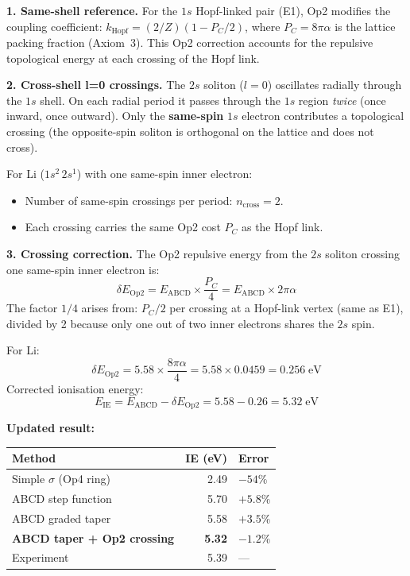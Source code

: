 \noindent\textbf{1. Same-shell reference.}
For the $1s$ Hopf-linked pair (E1), Op2
modifies the coupling coefficient:
$k_{\text{Hopf}} = (2/Z)(1 - P_C/2)$,
where $P_C = 8\pi\alpha$ is the lattice
packing fraction (Axiom~3).  This Op2
correction accounts for the repulsive
topological energy at each crossing of the
Hopf link.

\noindent\textbf{2. Cross-shell l=0 crossings.}
The $2s$ soliton ($l{=}0$) oscillates radially
through the $1s$ shell.  On each radial period
it passes through the $1s$ region \emph{twice}
(once inward, once outward).  Only the
\textbf{same-spin} $1s$ electron contributes
a topological crossing (the opposite-spin
soliton is orthogonal on the lattice and
does not cross).

For Li ($1s^2\,2s^1$) with one same-spin
inner electron:
\begin{itemize}
    \item Number of same-spin crossings
          per period: $n_{\text{cross}} = 2$.
    \item Each crossing carries the same
          Op2 cost $P_C$ as the Hopf link.
\end{itemize}

\noindent\textbf{3. Crossing correction.}
The Op2 repulsive energy from the $2s$
soliton crossing one same-spin inner electron
is:
\begin{equation}
    \delta E_{\text{Op2}} =
    E_{\text{ABCD}} \times
    \frac{P_C}{4}
    = E_{\text{ABCD}} \times 2\pi\alpha
    \label{eq:op2_cross_shell}
\end{equation}
The factor $1/4$ arises from:
$P_C/2$ per crossing at a Hopf-link vertex
(same as E1), divided by 2 because only one
out of two inner electrons shares the $2s$
spin.

For Li:
\begin{equation}
    \delta E_{\text{Op2}} = 5.58 \times
    \frac{8\pi\alpha}{4}
    = 5.58 \times 0.0459
    = 0.256\;\text{eV}
\end{equation}
Corrected ionisation energy:
\begin{equation}
    E_{\text{IE}} = E_{\text{ABCD}} -
    \delta E_{\text{Op2}}
    = 5.58 - 0.26 = 5.32\;\text{eV}
\end{equation}

\noindent\textbf{Updated result:}
\begin{center}
\small
\renewcommand{\arraystretch}{1.2}
\begin{tabular}{lrl}
\hline
\textbf{Method} & \textbf{IE (eV)}
& \textbf{Error} \\
\hline
Simple $\sigma$ (Op4 ring)
    & 2.49 & $-54\%$ \\
ABCD step function
    & 5.70 & $+5.8\%$ \\
ABCD graded taper
    & 5.58 & $+3.5\%$ \\
\textbf{ABCD taper + Op2 crossing}
    & \textbf{5.32} & $\mathbf{-1.2\%}$ \\
Experiment
    & 5.39 & --- \\
\hline
\end{tabular}
\end{center}

